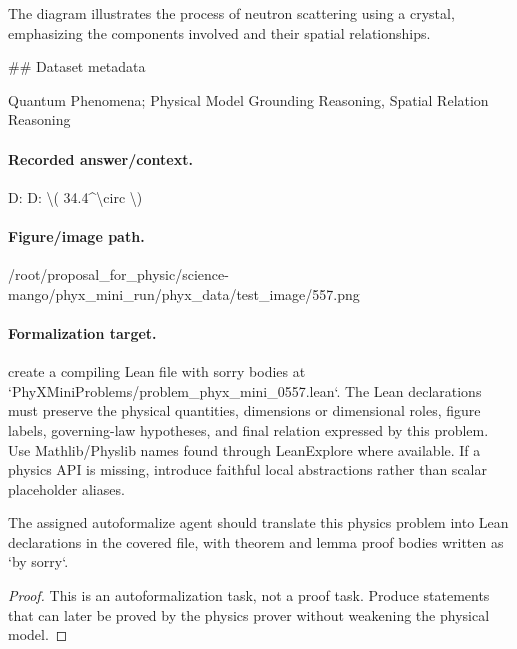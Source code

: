 The diagram illustrates the process of neutron scattering using a crystal, emphasizing the components involved and their spatial relationships.

\#\# Dataset metadata

Quantum Phenomena; Physical Model Grounding Reasoning, Spatial Relation Reasoning

\paragraph{Recorded answer/context.}
D: D: \textbackslash{}( 34.4\textasciicircum{}\textbackslash{}circ \textbackslash{})

\paragraph{Figure/image path.}
/root/proposal\_for\_physic/science-mango/phyx\_mini\_run/phyx\_data/test\_image/557.png

\paragraph{Formalization target.}
create a compiling Lean file with sorry bodies at `PhyXMiniProblems/problem\_phyx\_mini\_0557.lean`. The Lean declarations must preserve the physical quantities, dimensions or dimensional roles, figure labels, governing-law hypotheses, and final relation expressed by this problem.
Use Mathlib/Physlib names found through LeanExplore where available. If a physics API is missing, introduce faithful local abstractions rather than scalar placeholder aliases.

\begin{theorem}
\label{thm:physics:phyx_mini_0557:target}
The assigned autoformalize agent should translate this physics problem into Lean declarations in the covered file, with theorem and lemma proof bodies written as `by sorry`.
\end{theorem}
\begin{proof}
This is an autoformalization task, not a proof task. Produce statements that can later be proved by the physics prover without weakening the physical model.
\end{proof}

